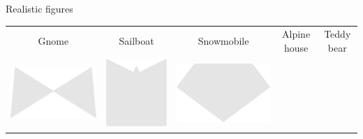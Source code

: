 \documentclass[14pt]{beamer}
\begin{document}
\begin{frame}{Realistic figures}
\begin{center}
{\begin{tabular}{ccccc}
                Gnome & Sailboat & Snowmobile & Alpine house & Teddy bear\\[2ex]
                \includegraphics[scale=0.21]{figures/figure026r.pdf} &
                \includegraphics[scale=0.21]{figures/figure026p.pdf} &
                \includegraphics[scale=0.21]{figures/figure026f.pdf} &

\end{tabular}}
\end{center}
\end{frame}
\end{document}
